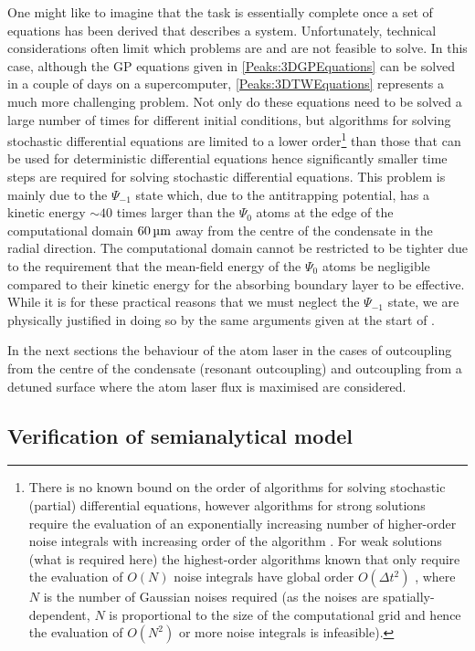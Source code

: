 One might like to imagine that the task is essentially complete once a set of equations has been derived that describes a system. Unfortunately, technical considerations often limit which problems are and are not feasible to solve. In this case, although the GP equations given in \eqref{Peaks:3DGPEquations} can be solved in a couple of days on a supercomputer, \eqref{Peaks:3DTWEquations} represents a much more challenging problem. Not only do these equations need to be solved a large number of times for different initial conditions, but algorithms for solving stochastic differential equations are limited to a lower order\footnote{There is no known bound on the order of algorithms for solving stochastic (partial) differential equations, however algorithms for strong solutions require the evaluation of an exponentially increasing number of higher-order noise integrals with increasing order of the algorithm \citep{Burrage:1997}. For weak solutions (what is required here) the highest-order algorithms known that only require the evaluation of $O(N)$ noise integrals have global order $O(\Delta t^2)$ \citep{Rosler:2007,Rosler:2009}, where $N$ is the number of Gaussian noises required (as the noises are spatially-dependent, $N$ is proportional to the size of the computational grid and hence the evaluation of $O(N^2)$ or more noise integrals is infeasible).} than those that can be used for deterministic differential equations hence significantly smaller time steps are required for solving stochastic differential equations. This problem is mainly due to the $\Psi_{-1}$ state which, due to the antitrapping potential, has a kinetic energy $\sim 40$ times larger than the $\Psi_{0}$ atoms at the edge of the computational domain $\unit[60]{\micro m}$ away from the centre of the condensate in the radial direction. The computational domain cannot be restricted to be tighter due to the requirement that the mean-field energy of the $\Psi_{0}$ atoms be negligible compared to their kinetic energy for the absorbing boundary layer to be effective. While it is for these practical reasons that we must neglect the $\Psi_{-1}$ state, we are physically justified in doing so by the same arguments given at the start of . 

In the next sections the behaviour of the atom laser in the cases of outcoupling from the centre of the condensate (resonant outcoupling) and outcoupling from a detuned surface where the atom laser flux is maximised are considered.

\subsection{Verification of semianalytical model}

